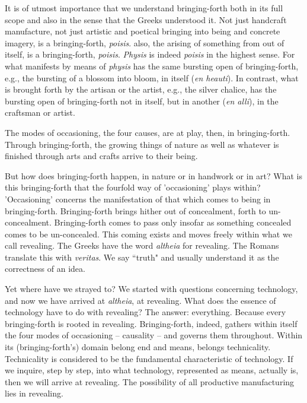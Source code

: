 It is of utmost importance that we understand bringing-forth both in its full scope and also in the sense that the Greeks understood it. Not just handcraft manufacture, not just artistic and poetical bringing into being and concrete imagery, is a bringing-forth, \textit{poisis}.  also, the arising of something from out of itself, is a bringing-forth, \textit{poisis}. \textit{Physis} is indeed \textit{poisis} in the highest sense. For what manifests by means of \textit{physis} has the same bursting open of bringing-forth, e.g., the bursting of a blossom into bloom, in itself (\textit{en heauti}). In contrast, what is brought forth by the artisan or the artist, e.g., the silver chalice, has the bursting open of bringing-forth not in itself, but in another (\textit{en alli}), in the craftsman or artist.

The modes of occasioning, the four causes, are at play, then, in bringing-forth. Through bringing-forth, the growing things of nature as well as whatever is finished through arts and crafts arrive to their being.

But how does bringing-forth happen, in nature or in handwork or in art? What is this bringing-forth that the fourfold way of 'occasioning' plays within? 'Occasioning' concerns the manifestation of that which comes to being in bringing-forth. Bringing-forth brings hither out of concealment, forth to un-concealment. Bringing-forth comes to pass only insofar as something concealed comes to be un-concealed. This coming exists and moves freely within what we call revealing. The Greeks have the word \textit{altheia} for revealing. The Romans translate this with \textit{veritas}. We say ``truth" and usually understand it as the correctness of an idea.



Yet where have we strayed to? We started with questions concerning technology, and now we have arrived at \textit{altheia}, at revealing. What does the essence of technology have to do with revealing? The answer: everything. Because every bringing-forth is rooted in revealing. Bringing-forth, indeed, gathers within itself the four modes of occasioning -- causality -- and governs them throughout. Within its (bringing-forth's) domain belong end and means, belongs technicality. Technicality is considered to be the fundamental characteristic of technology. If we inquire, step by step, into what technology, represented as means, actually is, then we will arrive at revealing. The possibility of all productive manufacturing lies in revealing.

